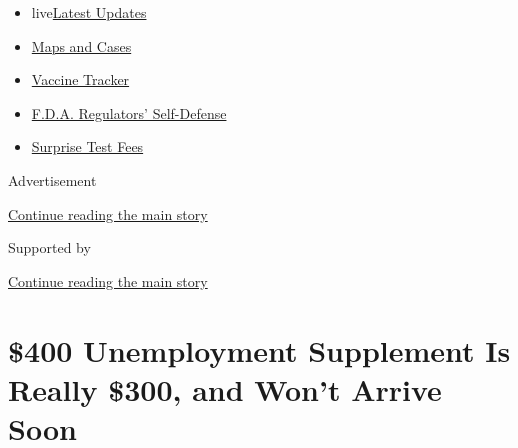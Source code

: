 \begin{itemize}
\tightlist
\item
  live\href{https://www.nytimes3xbfgragh.onion/2020/09/12/world/covid-19-coronavirus.html?name=styln-coronavirus-markets\&region=TOP_BANNER\&block=storyline_menu_recirc\&action=click\&pgtype=Article\&impression_id=e8f484d0-f527-11ea-afee-9f6e96515e5b\&variant=undefined}{Latest
  Updates}
\item
  \href{https://www.nytimes3xbfgragh.onion/interactive/2020/us/coronavirus-us-cases.html?name=styln-coronavirus-markets\&region=TOP_BANNER\&block=storyline_menu_recirc\&action=click\&pgtype=Article\&impression_id=e8f484d1-f527-11ea-afee-9f6e96515e5b\&variant=undefined}{Maps
  and Cases}
\item
  \href{https://www.nytimes3xbfgragh.onion/interactive/2020/science/coronavirus-vaccine-tracker.html?name=styln-coronavirus-markets\&region=TOP_BANNER\&block=storyline_menu_recirc\&action=click\&pgtype=Article\&impression_id=e8f484d2-f527-11ea-afee-9f6e96515e5b\&variant=undefined}{Vaccine
  Tracker}
\item
  \href{https://www.nytimes3xbfgragh.onion/2020/09/10/us/politics/fda-coronavirus-vaccine.html?name=styln-coronavirus-markets\&region=TOP_BANNER\&block=storyline_menu_recirc\&action=click\&pgtype=Article\&impression_id=e8f484d3-f527-11ea-afee-9f6e96515e5b\&variant=undefined}{F.D.A.
  Regulators' Self-Defense}
\item
  \href{https://www.nytimes3xbfgragh.onion/2020/09/09/upshot/coronavirus-surprise-test-fees.html?name=styln-coronavirus-markets\&region=TOP_BANNER\&block=storyline_menu_recirc\&action=click\&pgtype=Article\&impression_id=e8f484d4-f527-11ea-afee-9f6e96515e5b\&variant=undefined}{Surprise
  Test Fees}
\end{itemize}

Advertisement

\protect\hyperlink{after-top}{Continue reading the main story}

Supported by

\protect\hyperlink{after-sponsor}{Continue reading the main story}

\hypertarget{400-unemployment-supplement-is-really-300-and-wont-arrive-soon}{%
\section{\$400 Unemployment Supplement Is Really \$300, and Won't Arrive
Soon}\label{400-unemployment-supplement-is-really-300-and-wont-arrive-soon}}

